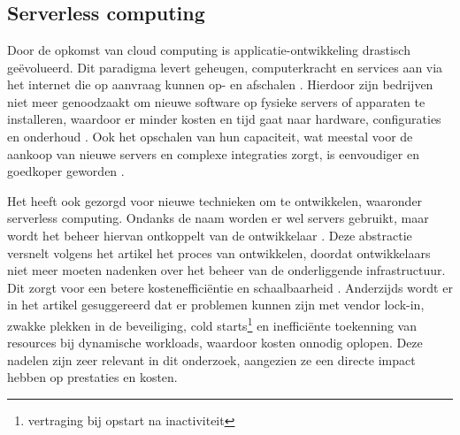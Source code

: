\chapter{}%
\label{ch:stand-van-zaken}



\section{Serverless computing}

Door de opkomst van cloud computing is applicatie-ontwikkeling drastisch geëvolueerd. Dit paradigma levert geheugen, computerkracht en services aan via het internet die op aanvraag kunnen op- en afschalen \autocite{Pubglob2024}. Hierdoor zijn bedrijven niet meer genoodzaakt om nieuwe software op fysieke servers of apparaten te installeren, waardoor er minder kosten en tijd gaat naar hardware, configuraties en onderhoud \autocite{SegunFalade2024}. Ook het opschalen van hun capaciteit, wat meestal voor de aankoop van nieuwe servers en complexe integraties zorgt, is eenvoudiger en goedkoper geworden \autocite{SegunFalade2024}.

Het heeft ook gezorgd voor nieuwe technieken om te ontwikkelen, waaronder serverless computing. Ondanks de naam worden er wel servers gebruikt, maar wordt het beheer hiervan ontkoppelt van de ontwikkelaar \autocite{Thatikonda2023}. Deze abstractie versnelt volgens het artikel \textcite{Ghorbian2025} het proces van ontwikkelen, doordat ontwikkelaars niet meer moeten nadenken over het beheer van de onderliggende infrastructuur. Dit zorgt voor een betere kostenefficiëntie en schaalbaarheid \autocite{Thatikonda2023}. Anderzijds wordt er in het artikel \textcite{Chippagiri2025} gesuggereerd dat er problemen kunnen zijn met vendor lock-in, zwakke plekken in de beveiliging, cold starts\footnote{vertraging bij opstart na inactiviteit} en inefficiënte toekenning van resources bij dynamische workloads, waardoor kosten onnodig oplopen. Deze nadelen zijn zeer relevant in dit onderzoek, aangezien ze een directe impact hebben op prestaties en kosten. 

